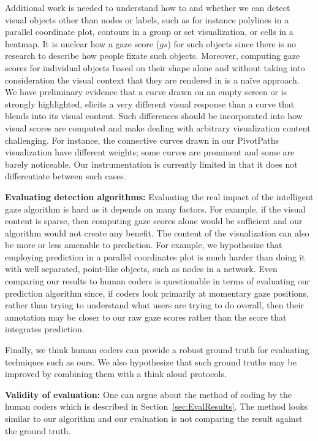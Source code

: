 Additional work is needed to understand how to and whether we can detect visual objects other than nodes or labels, such as for instance polylines in a parallel coordinate plot, contours in a group or set visualization, or cells in a heatmap. It is unclear how a gaze score ($gs$) for such objects since there is no research to describe how people fixate such objects. Moreover, computing gaze scores for individual objects based on their shape alone and without taking into consideration the visual context that they are rendered in is a naïve approach. We have preliminary evidence that a curve drawn on an empty screen or is strongly highlighted, elicits a very different visual response than a curve that blends into its visual content. Such differences should be incorporated into how visual scores are computed and make dealing with arbitrary visualization content challenging. For instance, the connective curves drawn in our PivotPaths visualization have different weights; some curves are prominent and some are barely noticeable. Our instrumentation is currently limited in that it does not differentiate between such cases.

\textbf{Evaluating detection algorithms:} Evaluating the real impact of the intelligent gaze algorithm is hard as it depends on many factors. For example, if the visual content is sparse, then computing gaze scores alone would be sufficient and our algorithm would not create any benefit. The content of the visualization can also be more or less amenable to prediction. For example, we hypothesize that employing prediction in a parallel coordinates plot is much harder than doing it with well separated, point-like objects, such as nodes in a network. Even comparing our results to human coders is questionable in terms of evaluating our prediction algorithm since, if coders look primarily at momentary gaze positions, rather than trying to understand what users are trying to do overall, then their annotation may be closer to our raw gaze scores rather than the score that integrates prediction. 

Finally, we think human coders can provide a robust ground truth for evaluating techniques such as ours. We also hypothesize that such ground truths may be improved by combining them with a think aloud protocols.

\textbf{Validity of evaluation:}
One can argue about the method of coding by the human coders which is described in Section~\ref{sec:EvalResults}. The method looks similar to our algorithm and our evaluation is not comparing the result against the ground truth. 

